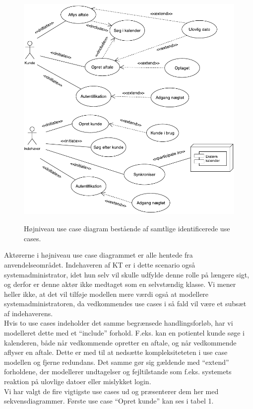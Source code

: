 \documentclass[12pt]{article}   %
\begin{document}
\begin{figure}[!ht]
\begin{center}
\includegraphics[width=12cm, height=12cm]{highlevel.pdf}
\caption{Højniveau use case diagram bestående af samtlige identificerede use cases.}
\label{fig:use}
\end{center}
\end{figure}

 
Aktørerne i højniveau use case diagrammet er alle hentede fra anvendelseområdet. Indehaveren af KT er i dette scenario også systemadministrator, idet hun selv vil
skulle udfylde denne rolle på længere sigt, og derfor er denne aktør ikke medtaget som en selvstændig klasse. Vi mener heller ikke, at det vil tilføje modellen mere værdi også at modellere systemadministratoren, da vedkommendes use cases i så fald vil være et subsæt af indehaverens.\\
Hvis to use cases indeholder det samme begrænsede handlingsforløb, har vi modelleret dette med et ``include'' forhold. F.eks. kan en potientel kunde søge i kalenderen,
både når vedkommende opretter en aftale, og når vedkommende aflyser en aftale. Dette er med til at nedsætte kompleksiteteten i use case modellen og fjerne redundans. Det samme gør sig gældende med ``extend'' forholdene, der modellerer undtagelser og fejltilstande som f.eks. systemets reaktion på ulovlige datoer eller mislykket login.\\
Vi har valgt de fire vigtigste use cases ud og præsenterer dem her med sekvensdiagrammer. Første use case ``Opret kunde'' kan ses i tabel 1.\\
\end{document}
